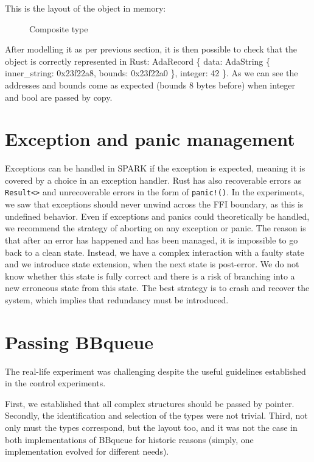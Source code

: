 \documentclass[nomenclature, english, bibtex]{kththesis}
\newcommand{\inlinecode}[1]{\texttt{#1}}
\begin{document}
This is the layout of the object in memory:

\begin{figure}[ht!]
    \centering
  \caption{Composite type}
  \label{fig:memlayout}
\end{figure}

After modelling it as per previous section, it is then possible to check that the object is correctly represented in Rust: AdaRecord \{ data: AdaString \{ inner\_string: 0x23f22a8, bounds: 0x23f22a0 \}, integer: 42 \}. As we can see the addresses and bounds come as expected (bounds 8 bytes before) when integer and bool are passed by copy.

\section{Exception and panic management}


Exceptions can be handled in SPARK if the exception is expected, meaning it is covered by a choice in an exception handler. 
Rust has also recoverable errors as \inlinecode{Result<>} and unrecoverable errors in the form of \inlinecode{panic!()}. In the experiments, we saw that exceptions should never unwind across the FFI boundary, as this is undefined behavior. 
Even if exceptions and panics could theoretically be handled, we recommend the strategy of aborting on any exception or panic. The reason is that after an error has happened and has been managed, it is impossible to go back to a clean state. Instead, we have a complex interaction with a faulty state and we introduce state extension, when the next state is post-error. We do not know whether this state is fully correct and there is a risk of branching into a new erroneous state from this state. The best strategy is to crash and recover the system, which implies that redundancy must be introduced.

\section{Passing BBqueue}

The real-life experiment was challenging despite the useful guidelines established in the control experiments.

First, we established that all complex structures should be passed by pointer.
Secondly, the identification and selection of the types were not trivial.
Third, not only must the types correspond, but the layout too, and it was not the case in both implementations of BBqueue for historic reasons (simply, one implementation evolved for different needs).
\end{document}
